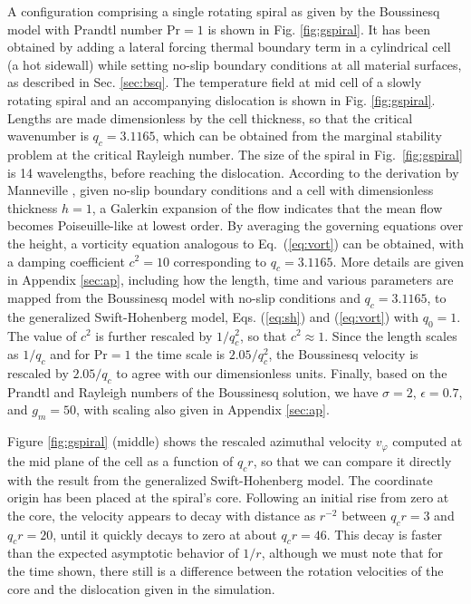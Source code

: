 \documentclass[preprint,prx,floatfix]{revtex4-1}
\begin{document}
A configuration comprising a single rotating spiral as given by the Boussinesq model with Prandtl number $\text{Pr} = 1$ is shown in Fig. \ref{fig:gspiral}. It has been obtained by adding a lateral forcing thermal boundary term in a cylindrical cell (a hot sidewall) while setting no-slip boundary conditions at all material surfaces, as described in Sec. \ref{sec:bsq}. The temperature field at mid cell of a slowly rotating spiral and an accompanying dislocation is shown in Fig. \ref{fig:gspiral}. Lengths are made dimensionless by the cell thickness, so that the critical wavenumber is $q_c = 3.1165$, which can be obtained from the marginal stability problem at the critical Rayleigh number. The size of the spiral in Fig.~\ref{fig:gspiral} is 14 wavelengths, before reaching the dislocation. According to the derivation by Manneville \cite{manneville1984modelisation}, given no-slip boundary conditions and a cell with dimensionless thickness $h = 1$, a Galerkin expansion of the flow indicates that the mean flow becomes Poiseuille-like at lowest order. By averaging the governing equations over the height, a vorticity equation analogous to Eq.~(\ref{eq:vort}) can be obtained, with a damping coefficient $c^2 = 10$ corresponding to $q_c = 3.1165$. More details are given in Appendix \ref{sec:ap}, including how the length, time and various parameters are mapped from the Boussinesq model with no-slip conditions and $q_c = 3.1165$, to the generalized Swift-Hohenberg model, Eqs. (\ref{eq:sh}) and (\ref{eq:vort}) with $q_0 = 1$. The value of $c^{2}$ is further rescaled by $1/q_c^2$, so that $c^2 \approx 1$. Since the length scales as $1/q_c$ and for $\text{Pr} = 1$ the time scale is $2.05/q_c^2$, the Boussinesq velocity is rescaled by $2.05/q_c$ to agree with our dimensionless units. Finally, based on the Prandtl and Rayleigh numbers of the Boussinesq solution, we have $\sigma = 2$, $\epsilon = 0.7$, and $g_m = 50$, with scaling also given in Appendix \ref{sec:ap}.

Figure \ref{fig:gspiral} (middle) shows the rescaled azimuthal velocity $v_\varphi$ computed at the mid plane of the cell as a function of $q_{c}r$, so that we can compare it directly with the result from the generalized Swift-Hohenberg model. The coordinate origin has been placed at the spiral's core. Following an initial rise from zero at the core, the velocity appears to decay with distance as $r^{-2}$ between $q_{c}r=3$ and $q_{c}r = 20$, until it quickly decays to zero at about $q_{c} r = 46$. This decay is faster than the expected asymptotic behavior of $1/r$, although we must note that for the time shown, there still is a difference between the rotation velocities of the core and the dislocation given in the simulation.
\end{document}
